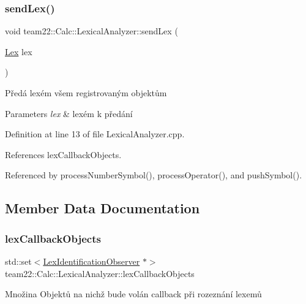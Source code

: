 \subsubsection{\texorpdfstring{send\+Lex()}{sendLex()}}
{\footnotesize\ttfamily void team22\+::\+Calc\+::\+Lexical\+Analyzer\+::send\+Lex (\begin{DoxyParamCaption}\item[{\hyperlink{classteam22_1_1_calc_1_1_lex}{Lex}}]{lex }\end{DoxyParamCaption})\hspace{0.3cm}{\ttfamily [private]}}

Předá lexém všem registrovaným objektům 
\begin{DoxyParams}{Parameters}
{\em lex} & lexém k předání \\
\hline
\end{DoxyParams}


Definition at line 13 of file Lexical\+Analyzer.\+cpp.



References lex\+Callback\+Objects.



Referenced by process\+Number\+Symbol(), process\+Operator(), and push\+Symbol().



\subsection{Member Data Documentation}
\mbox{\label{classteam22_1_1_calc_1_1_lexical_analyzer_ab8018dc24a6f4e188a901c83bbd9fdb1}} 
\subsubsection{\texorpdfstring{lex\+Callback\+Objects}{lexCallbackObjects}}
{\footnotesize\ttfamily std\+::set$<$\hyperlink{classteam22_1_1_calc_1_1_lex_identification_observer}{Lex\+Identification\+Observer} $\ast$$>$ team22\+::\+Calc\+::\+Lexical\+Analyzer\+::lex\+Callback\+Objects\hspace{0.3cm}{\ttfamily [private]}}

Množina Objektů na nichž bude volán callback při rozeznání lexemů 

